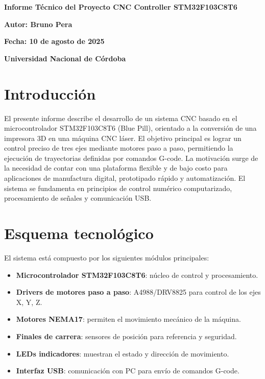 \documentclass[a4paper,12pt]{article}
\begin{document}
\begin{titlepage}
    \centering
    \vspace*{3cm}
    {\Huge\bfseries Informe Técnico del Proyecto CNC Controller STM32F103C8T6 \par}
    \vspace{2cm}
    {\Large\bfseries Autor: Bruno Pera \par}
    \vspace{1cm}
    {\large\bfseries Fecha: 10 de agosto de 2025 \par}
    \vspace{2cm}
    {\large\bfseries Universidad Nacional de Córdoba \par}
    \vfill
\end{titlepage}

\section{Introducción}
El presente informe describe el desarrollo de un sistema CNC basado en el microcontrolador STM32F103C8T6 (Blue Pill), orientado a la conversión de una impresora 3D en una máquina CNC láser. El objetivo principal es lograr un control preciso de tres ejes mediante motores paso a paso, permitiendo la ejecución de trayectorias definidas por comandos G-code. La motivación surge de la necesidad de contar con una plataforma flexible y de bajo costo para aplicaciones de manufactura digital, prototipado rápido y automatización. El sistema se fundamenta en principios de control numérico computarizado, procesamiento de señales y comunicación USB.

\section{Esquema tecnológico}
El sistema está compuesto por los siguientes módulos principales:
\begin{itemize}
    \item \textbf{Microcontrolador STM32F103C8T6}: núcleo de control y procesamiento.
    \item \textbf{Drivers de motores paso a paso}: A4988/DRV8825 para control de los ejes X, Y, Z.
    \item \textbf{Motores NEMA17}: permiten el movimiento mecánico de la máquina.
    \item \textbf{Finales de carrera}: sensores de posición para referencia y seguridad.
    \item \textbf{LEDs indicadores}: muestran el estado y dirección de movimiento.
    \item \textbf{Interfaz USB}: comunicación con PC para envío de comandos G-code.
\end{itemize}
\end{document}
